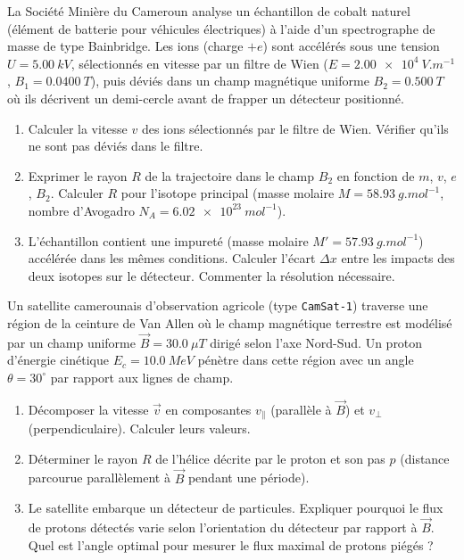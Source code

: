 \documentclass[11pt]{article}
\begin{document}
\begin{exercice}
La Société Minière du Cameroun analyse un échantillon de cobalt naturel (élément de batterie pour véhicules électriques) à l'aide d'un spectrographe de masse de type Bainbridge. Les ions  (charge $+e$) sont accélérés sous une tension $U = \SI{5,00}{kV}$, sélectionnés en vitesse par un filtre de Wien ($E = \SI{2,00e4}{V.m^{-1}}$, $B_1 = \SI{0,0400}{T}$), puis déviés dans un champ magnétique uniforme $B_2 = \SI{0,500}{T}$ où ils décrivent un demi-cercle avant de frapper un détecteur positionné.
\begin{enumerate}
    \item Calculer la vitesse $v$ des ions sélectionnés par le filtre de Wien. Vérifier qu'ils ne sont pas déviés dans le filtre.
    \item Exprimer le rayon $R$ de la trajectoire dans le champ $B_2$ en fonction de $m$, $v$, $e$, $B_2$. Calculer $R$ pour l'isotope principal  (masse molaire $M = \SI{58,93}{g.mol^{-1}}$, nombre d'Avogadro $N_A = \SI{6,02e23}{mol^{-1}}$).
    \item L'échantillon contient une impureté  (masse molaire $M' = \SI{57,93}{g.mol^{-1}}$) accélérée dans les mêmes conditions. Calculer l'écart $\Delta x$ entre les impacts des deux isotopes sur le détecteur. Commenter la résolution nécessaire.
\end{enumerate}
\end{exercice}

\begin{exercice}
Un satellite camerounais d'observation agricole (type \texttt{CamSat-1}) traverse une région de la ceinture de Van Allen où le champ magnétique terrestre est modélisé par un champ uniforme $\vec{B} = \SI{30,0}{\mu T}$ dirigé selon l'axe Nord-Sud. Un proton d'énergie cinétique $E_c = \SI{10,0}{MeV}$ pénètre dans cette région avec un angle $\theta = 30^\circ$ par rapport aux lignes de champ.
\begin{enumerate}
    \item Décomposer la vitesse $\vec{v}$ en composantes $v_{\parallel}$ (parallèle à $\vec{B}$) et $v_{\perp}$ (perpendiculaire). Calculer leurs valeurs.
    \item Déterminer le rayon $R$ de l'hélice décrite par le proton et son pas $p$ (distance parcourue parallèlement à $\vec{B}$ pendant une période).
    \item Le satellite embarque un détecteur de particules. Expliquer pourquoi le flux de protons détectés varie selon l'orientation du détecteur par rapport à $\vec{B}$. Quel est l'angle optimal pour mesurer le flux maximal de protons piégés ?
\end{enumerate}
\end{exercice}
\end{document}
